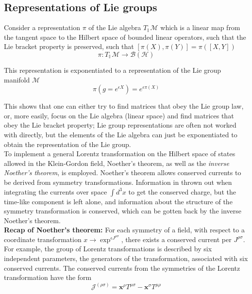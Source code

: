 \subsection*{Representations of Lie groups}

Consider a representation $\pi$ of the Lie algebra $T_\mathbb{I}\,\mathcal{M}$ which is a linear map from the tangent space to the Hilbert space of bounded linear operators, such that the Lie bracket property is preserved, such that $[\pi(X), \pi(Y)] = \pi([X,Y])$
\begin{equation}
\pi : T_\mathbb{I}\,\mathcal{M} \rightarrow \mathcal{B} (\mathcal{H})
\end{equation}

\noindent This representation is exponentiated to a representation of the Lie group manifold $\mathcal{M}$
\begin{equation}
\pi(g = e^{\epsilon X}) = e^{\epsilon \pi(X)}
\end{equation}

\noindent This shows that one can either try to find matrices that obey the Lie group law, or, more easily, focus on the Lie algebra (linear space) and find matrices that obey the Lie bracket property; Lie group representations are often not worked with directly, but the elements of the Lie algebra can just be exponentiated to obtain the representation of the Lie group. \\

\noindent To implement a general Lorentz transformation on the Hilbert space of states allowed in the Klein-Gordon field, Noether's theorem, as well as the \textit{inverse Noether's theorem}, is employed. Noether's theorem allows conserved currents to be derived from symmetry transformations. Information in thrown out when integrating the currents over space $\int d^3 x$ to get the conserved charge, but the time-like component is left alone, and information about the structure of the symmetry transformation is conserved, which can be gotten back by the inverse Noether's theorem. \\

\noindent \textbf{Recap of Noether's theorem:} For each symmetry of a field, with respect to a coordinate transformation $x \rightarrow \exp^{\epsilon J ^{\rho\sigma}}$, there exists a conserved current per $J^{\rho\sigma}$. For example, the group of Lorentz transformations is described by six independent parameters, the generators of the transformation, associated with six conserved currents. The conserved currents from the symmetries of the Lorentz transformation have the form
\begin{equation}
\mathcal{J}^{(\rho\sigma)} = \textbf{x}^\rho T^{\mu\sigma} - \textbf{x}^\sigma T^{\mu\rho}
\end{equation}

